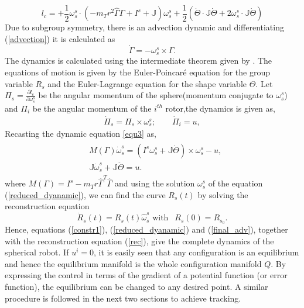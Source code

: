\documentclass{ifacconf}
\begin{document}
$$l_{c} = + \frac{1}{2} \omega_{s}^{s}\cdot (- m_{T}r^{2}\widehat{\Gamma}\widehat{\Gamma} + I^{s} + \mathbb{J}) \omega_{s}^{s} + \frac{1}{2}\left( \dot{\Theta} \cdot \mathbb{J}\dot{\Theta} + 2 \omega_{s}^{s}\cdot \mathbb{J}\dot{\Theta}\right)$$
Due to subgroup symmetry, there is an advection dynamic and differentiating (\ref{advection}) it is calculated as
\begin{equation}\label{final_adv}
\dot{\Gamma} = - \omega_{s}^{s} \times \Gamma.
\end{equation}
The dynamics is calculated using the intermediate theorem given by \citep{schneider}. The equations of motion is given by the Euler-Poincar\'{e} equation for the group variable $R_{s}$ and the Euler-Lagrange equation for the shape variable $\Theta$.
Let $\Pi_{s} = \frac{\partial l_{c}}{\partial \omega_{s}^{s}} $ be the angular momentum of the sphere(momentum conjugate to $\omega_{s}^{s}$) and $\Pi_{i}$ be the angular momentum of the $i^{th}$ rotor,the dynamics is given as, 
\begin{align}\label{equ3}
\dot{\Pi}_{s} = \Pi_{s} \times \omega_{s}^{s}; \quad \quad \dot{\Pi}_{i} = u,
\end{align}
Recasting the dynamic equation \eqref{equ3} as,
\begin{align}\label{reduced_dyanamic}
\begin{split}
& M(\Gamma) \dot{\omega}_{s}^{s} = (I^{s} \omega_{s}^{s} + \mathbb{J}\dot{\Theta}) \times \omega_{s}^{s} - u,\\
& \mathbb{J}\dot{\omega}_{s}^{s} + \mathbb{J}\ddot{\Theta} = u.
\end{split}
\end{align}
where $M(\Gamma)= I^{s} - m_{T}r\widehat{\Gamma}^{T}\widehat{\Gamma}$ and using the solution $\omega_{s}^{s}$ of the equation (\ref{reduced_dyanamic}), we can find the curve $R_{s}(t)$ by solving the reconstruction equation 
\begin{equation}\label{rec}
\dot{R}_{s}(t) = R_{s}(t)\widehat{\omega}_{s}^{s} \text{  with  }~~R_{s}(0)=R_{s_{0}}.
\end{equation}
Hence, equations (\ref{constr1}), (\ref{reduced_dyanamic}) and (\ref{final_adv}), together with the reconstruction equation (\ref{rec}), give the complete dynamics of the spherical robot. If $u^{i}=0$, it is easily seen that any configuration is an equilibrium and hence the equilibrium manifold is the whole configuration manifold $Q$. By expressing the control in terms of the gradient of a potential function (or error function), the equilibrium can be changed to any desired point. A similar procedure is followed in the next two sections to achieve tracking. 
\end{document}

